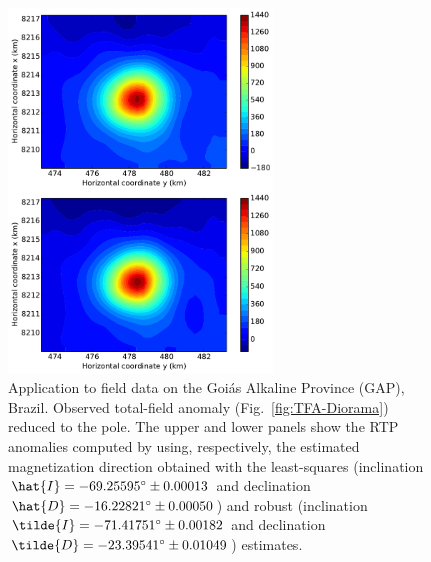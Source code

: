 \documentclass[journal abbreviation, npg]{copernicus}
\providecommand{\DIFaddbegin}{} %
\providecommand{\DIFaddend}{} %
\providecommand{\DIFaddbeginFL}{} %
\providecommand{\DIFaddendFL}{} %
\providecommand{\DIFdelbeginFL}{} %
\providecommand{\DIFdelendFL}{} %
\begin{document}
\DIFaddbegin \clearpage

\DIFaddend \begin{figure}[t]
  \DIFdelbeginFL %
\DIFdelendFL \DIFaddbeginFL \includegraphics[width=70mm]{Figures/npgd-2014-0069-f16}
  \DIFaddendFL \caption{Application to field data on the Goi\'{a}s Alkaline
    Province (GAP), Brazil. Observed total-field anomaly
    (Fig.~\ref{fig:TFA-Diorama}) reduced to the pole. The upper and
    lower panels show the RTP anomalies computed by using,
    respectively, the estimated magnetization direction obtained with
    the least-squares (inclination $\hat{I} = -69.25595{\degree} \pm
    0.00013${\degree} and declination $\hat{D} = -16.22821{\degree}
    \pm 0.00050${\degree}) and robust (inclination $\tilde{I} =
    -71.41751{\degree} \pm 0.00182${\degree} and declination
    $\tilde{D} = -23.39541{\degree} \pm 0.01049${\degree}) estimates. }
\label{fig:TFA-Diorama-RTP}
\end{figure}

\DIFaddbegin \clearpage
\end{document}
